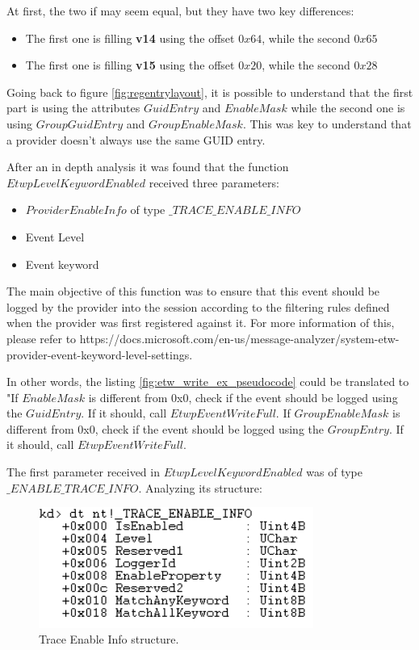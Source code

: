 At first, the two if may seem equal, but they have two key differences: 
\begin{itemize}
\setlength\itemsep{0.05em}
  \item The first one is filling {\bfseries v14} using the offset $0x64$, while the second $0x65$
  \item The first one is filling {\bfseries v15} using the offset $0x20$, while the second $0x28$
\end{itemize}

Going back to figure \ref{fig:regentrylayout}, it is possible to understand that the first part is using the attributes $GuidEntry$ and $EnableMask$ while the second one is using $GroupGuidEntry$ and $GroupEnableMask$. This was key to understand that a provider doesn't always use the same GUID entry.

After an in depth analysis it was found that the function $EtwpLevelKeywordEnabled$ received three parameters: 
\begin{itemize}
\setlength\itemsep{0.05em}
  \item $ProviderEnableInfo$ of type $\_TRACE\_ENABLE\_INFO$
  \item Event Level
  \item Event keyword
\end{itemize}

The main objective of this function was to ensure that this event should be logged by the provider into the session according to the filtering rules defined when the provider was first registered against it. For more information of this, please refer to https://docs.microsoft.com/en-us/message-analyzer/system-etw-provider-event-keyword-level-settings. 


In other words, the listing \ref{fig:etw_write_ex_pseudocode} could be translated to "If $EnableMask$ is different from 0x0, check if the event should be logged using the $GuidEntry$. If it should, call $EtwpEventWriteFull$. If $GroupEnableMask$ is different from 0x0, check if the event should be logged using the $GroupEntry$. If it should, call $EtwpEventWriteFull$.


The first parameter received in $EtwpLevelKeywordEnabled$ was of type $\_ENABLE\_TRACE\_INFO$. Analyzing its structure: 

\begin{centering}
  \begin{figure}[H]
    \includegraphics[width=9cm]{images/trace_enable_info.png}
    \caption[]{Trace Enable Info structure.}
    \label{fig:trace_enable_info}
  \end{figure}
\end{centering}

